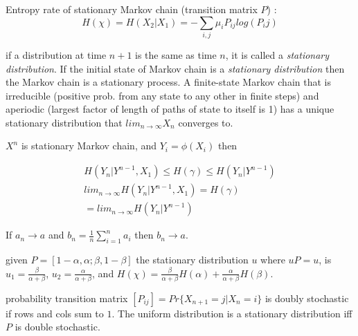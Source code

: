 \documentclass[10pt]{article}
\begin{document}
\begin{scriptsize}
\begin{multicols}{3}
\noindent Entropy rate of stationary Markov chain (transition matrix $P$) :
\begin{equation}
H(\chi) = H(X_2|X_1) = -\sum_{i,j} \mu_i P_{ij}log(P_ij)
\end{equation}

 if a distribution at time $n+1$ is the same as time $n$, it is called a {\it stationary distribution}. If the initial state of Markov chain is a {\it stationary distribution} then the Markov chain is a stationary process. A finite-state Markov chain that is irreducible (positive prob. from any state to any other in finite steps) and aperiodic (largest factor of length of paths of state to itself is 1) has a unique stationary distribution that $lim_{n \to \infty}X_n$ converges to.

$X^n$ is stationary Markov chain, and $Y_i = \phi(X_i)$ then

\begin{eqnarray*}
H(Y_n | Y^{n-1}, X_1) \leq H(\gamma) \leq H(Y_n|Y^{n-1})\\
lim_{n \to \infty}H(Y_n|Y^{n-1},X_1) = H(\gamma) \\
= lim_{n \to \infty} H(Y_n | Y^{n-1})
\end{eqnarray*}

 If $a_n \to a$ and $b_n = \frac{1}{n}\sum_{i=1}^n a_i$ then $b_n \to a$. 

 given $P=[1-\alpha, \alpha; \beta, 1-\beta]$ the stationary distribution $u$ where $uP = u$, is $u_1 = \frac{\beta}{\alpha+\beta}$, $u_2 = \frac{\alpha}{\alpha+\beta}$, and $H(\chi) = \frac{\beta}{\alpha + \beta}H(\alpha) + \frac{\alpha}{\alpha+\beta}H(\beta)$. 

 probability transition matrix $[P_{ij}] = Pr\{X_{n+1} = j | X_n = i\}$ is doubly stochastic if rows and cols sum to $1$. The uniform distribution is a stationary distribution iff $P$ is double stochastic.

\end{multicols}
\end{scriptsize}
\end{document}
